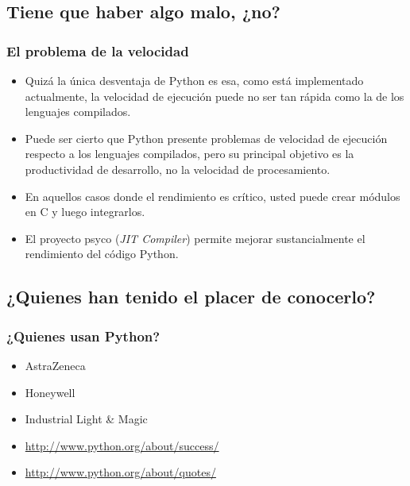 \documentclass{beamer}
\begin{document}
\subsection{Tiene que haber algo malo, ¿no?}
\begin{frame}
  \frametitle{El problema de la velocidad}
  \begin{itemize}[<+->]
    \item
      Quizá la única desventaja de \alert{Python} es esa, como está implementado
      actualmente, la velocidad de ejecución puede no ser tan rápida como la
      de los lenguajes compilados.
    \item
      Puede ser cierto que \alert{Python} presente problemas de velocidad de ejecución
      respecto a los lenguajes compilados, pero su principal objetivo es la
      productividad de desarrollo, no la velocidad de procesamiento.
    \item
      En aquellos casos donde el rendimiento es crítico, usted puede crear
      módulos en \alert{C} y luego integrarlos.
    \item
      El proyecto \alert{psyco} (\emph{JIT Compiler}) permite mejorar sustancialmente el
      rendimiento del código \alert{Python}.
  \end{itemize}
\end{frame}

\subsection{¿Quienes han tenido el placer de conocerlo?}
\begin{frame}
  \frametitle{¿Quienes usan Python?}
  \begin{itemize}[<+->]
    \item
      AstraZeneca
    \item
      Honeywell
    \item
      Industrial Light \& Magic
    \item
      \url{http://www.python.org/about/success/}
    \item
      \url{http://www.python.org/about/quotes/}
  \end{itemize}
\end{frame}
\end{document}
